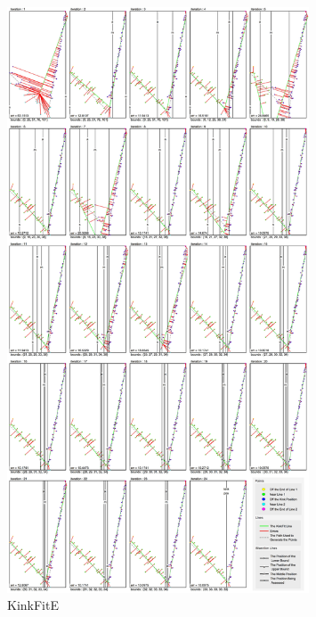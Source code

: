 \begin{figure}[h!]
  \centering
    \includegraphics[width=0.80\textwidth]{Chapter4/Figs/KinkFit_E.jpg}
    \caption{KinkFitE}\label{fig:KinkFitE}
\end{figure}

